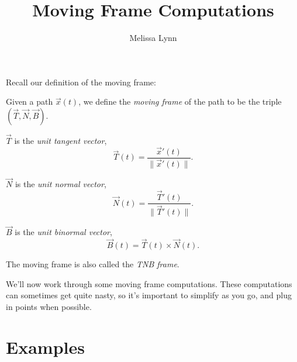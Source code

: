 \documentclass{ximera}
\title{Moving Frame Computations}
\author{Melissa Lynn}
\begin{document}
\begin{abstract}
\end{abstract}
\maketitle

Recall our definition of the moving frame:

\begin{definition}
Given a path $\vec{x}(t)$, we define the \emph{moving frame} of the path to be the triple $(\vec{T},\vec{N},\vec{B})$.

$\vec{T}$ is the \emph{unit tangent vector},
\[
\vec{T}(t) = \dfrac{\vec{x}'(t)}{\|\vec{x}'(t)\|}.
\]

$\vec{N}$ is the \emph{unit normal vector},
\[
\vec{N}(t) = \dfrac{\vec{T}'(t)}{\|\vec{T}'(t)\|}.
\]

$\vec{B}$ is the \emph{unit binormal vector},
\[
\vec{B}(t) = \vec{T}(t)\times\vec{N}(t).
\] 

The moving frame is also called the \emph{TNB frame}.
\end{definition}

We'll now work through some moving frame computations. These computations can sometimes get quite nasty, so it's important to simplify as you go, and plug in points when possible.

\section*{Examples}
\end{document}
